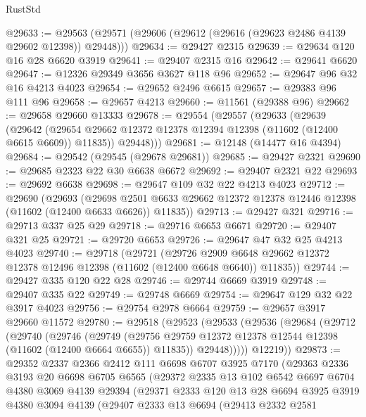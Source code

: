 \begin{lexlean}{RustStd}
\begin{coremodule}
@29633 := @29563 (@29571 (@29606 (@29612 (@29616 (@29623 @2486 @4139 @29602 @12398)) @29448)))
@29634 := @29427 @2315
@29639 := @29634 @120 @16 @28 @6620 @3919
@29641 := @29407 @2315 @16
@29642 := @29641 @6620
@29647 := @12326 @29349 @3656 @3627 @118 @96
@29652 := @29647 @96 @32 @16 @4213 @4023
@29654 := @29652 @2496 @6615
@29657 := @29383 @96 @111 @96
@29658 := @29657 @4213
@29660 := @11561 (@29388 @96)
@29662 := @29658 @29660 @13333
@29678 := @29554
    (@29557
      (@29633
        (@29639
          (@29642 (@29654 @29662 @12372 @12378 @12394 @12398 (@11602 (@12400 @6615 @6609)) @11835))
          @29448)))
@29681 := @12148 (@14477 @16 @4394)
@29684 := @29542 (@29545 (@29678 @29681))
@29685 := @29427 @2321
@29690 := @29685 @2323 @22 @30 @6638 @6672
@29692 := @29407 @2321 @22
@29693 := @29692 @6638
@29698 := @29647 @109 @32 @22 @4213 @4023
@29712 := @29690
    (@29693
      (@29698 @2501 @6633 @29662 @12372 @12378 @12446 @12398 (@11602 (@12400 @6633 @6626)) @11835))
@29713 := @29427 @321
@29716 := @29713 @337 @25 @29
@29718 := @29716 @6653 @6671
@29720 := @29407 @321 @25
@29721 := @29720 @6653
@29726 := @29647 @47 @32 @25 @4213 @4023
@29740 := @29718
    (@29721
      (@29726 @2909 @6648 @29662 @12372 @12378 @12496 @12398 (@11602 (@12400 @6648 @6640)) @11835))
@29744 := @29427 @335 @120 @22 @28
@29746 := @29744 @6669 @3919
@29748 := @29407 @335 @22
@29749 := @29748 @6669
@29754 := @29647 @129 @32 @22 @3917 @4023
@29756 := @29754 @2978 @6664
@29759 := @29657 @3917 @29660 @11572
@29780 := @29518
    (@29523
      (@29533
        (@29536
          (@29684
            (@29712
              (@29740
                (@29746
                  (@29749
                    (@29756
                      @29759
                      @12372
                      @12378
                      @12544
                      @12398
                      (@11602 (@12400 @6664 @6655))
                      @11835))
                  @29448)))))
        @12219))
@29873 := @29352
    @2337
    @2366
    @2412
    @111
    @6698
    @6707
    @3925
    @7170
    (@29363
      @2336
      @3193
      @20
      @6698
      @6705
      @6565
      (@29372
        @2335
        @13
        @102
        @6542
        @6697
        @6704
        @4380
        @3069
        @4139
        @29394
        (@29371
          @2333
          @120
          @13
          @28
          @6694
          @3925
          @3919
          @4380
          @3094
          @4139
          (@29407
            @2333
            @13
            @6694
            (@29413
              @2332
              @2581

\end{coremodule}
\end{lexlean}

